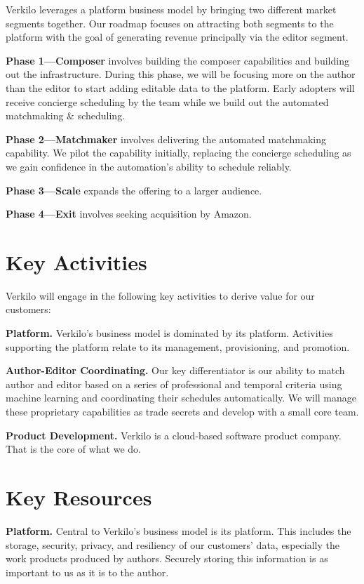 \documentclass[11pt,openany]{book}
\begin{document}
Verkilo leverages a platform business model by bringing two different
market segments together. Our roadmap focuses on attracting both
segments to the platform with the goal of generating revenue principally
via the editor segment.

\textbf{Phase 1---Composer} involves building the composer capabilities
and building out the infrastructure. During this phase, we will be
focusing more on the author than the editor to start adding editable
data to the platform. Early adopters will receive concierge scheduling
by the team while we build out the automated matchmaking \& scheduling.

\textbf{Phase 2---Matchmaker} involves delivering the automated
matchmaking capability. We pilot the capability initially, replacing the
concierge scheduling as we gain confidence in the automation's ability
to schedule reliably.

\textbf{Phase 3---Scale} expands the offering to a larger audience.

\textbf{Phase 4---Exit} involves seeking acquisition by Amazon.

\hypertarget{key-activities}{%
\section{Key Activities}\label{key-activities}}

Verkilo will engage in the following key activities to derive value for
our customers:

\textbf{Platform.} Verkilo's business model is dominated by its
platform. Activities supporting the platform relate to its management,
provisioning, and promotion.

\textbf{Author-Editor Coordinating.} Our key differentiator is our
ability to match author and editor based on a series of professional and
temporal criteria using machine learning and coordinating their
schedules automatically. We will manage these proprietary capabilities
as trade secrets and develop with a small core team.

\textbf{Product Development.} Verkilo is a cloud-based software product
company. That is the core of what we do.

\hypertarget{key-resources}{%
\section{Key Resources}\label{key-resources}}

\textbf{Platform.} Central to Verkilo's business model is its platform.
This includes the storage, security, privacy, and resiliency of our
customers' data, especially the work products produced by authors.
Securely storing this information is as important to us as it is to the
author.
\end{document}
